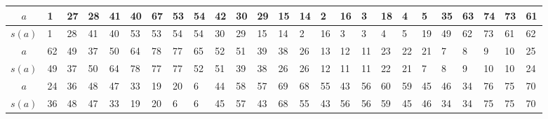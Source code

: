 \begin{center}
\begin{minipage}{\textwidth}
\renewcommand{\arraystretch}{1.15}
\begin{scriptsize}
\begin{tabular}{|c|*{24}{|p{.15cm}}|}
\hline
$a$&1&27&28&41&40&67&53&54&42&30&29&15&14&2&16&3&18&4&5&35&63&74&73&61 \\
\hline
$s(a)$&1&28&41&40&53&53&54&54&30&29&15&14&2&16&3&3&4&5&19&49&62&73&61&62\\
\hline \hline
$a$&62&49&37&50&64&78&77&65&52&51&39&38&26&13&12&11&23&22&21&7&8&9&10&25\\
\hline
$s(a)$&49&37&50&64&78&77&77&52&51&39&38&26&26&12&11&11&22&21&7&8&9&10&10&24\\
\hline \hline
$a$&24&36&48&47&33&19&20&6&44&58&57&69&68&55&43&56&60&59&45&46&34&76&75&70\\
\hline
$s(a)$&36&48&47&33&19&20&6&6&45&57&43&68&55&43&56&56&59&45&46&34&34&75&75&70\\
\hline
\end{tabular}
\label{Beispiel_HO_Maximalmengen}
\end{scriptsize} 
\renewcommand{\arraystretch}{1}


\end{minipage}
\end{center}
